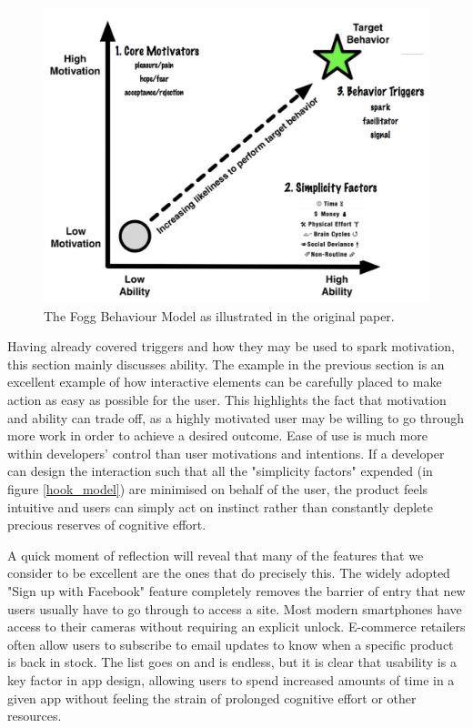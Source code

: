 \begin{figure}[h]
    \begin{center}
        \includegraphics[scale=0.3]{images/fogg_behaviour.png}
    \end{center}
    \caption{The Fogg Behaviour Model as illustrated in the original paper.}
    \label{fig:fogg_behaviour}
\end{figure}

Having already covered triggers and how they may be used to spark motivation, this section mainly discusses ability. The example in the previous section is an excellent example of how interactive elements can be carefully placed to make action as easy as possible for the user. This highlights the fact that motivation and ability can trade off, as a highly motivated user may be willing to go through more work in order to achieve a desired outcome. Ease of use is much more within developers' control than user motivations and intentions. If a developer can design the interaction such that all the "simplicity factors" expended (in figure \ref{hook_model}) are minimised on behalf of the user, the product feels intuitive and users can simply act on instinct rather than constantly deplete precious reserves of cognitive effort.

A quick moment of reflection will reveal that many of the features that we consider to be excellent are the ones that do precisely this. The widely adopted "Sign up with Facebook" feature completely removes the barrier of entry that new users usually have to go through to access a site. Most modern smartphones have access to their cameras without requiring an explicit unlock. E-commerce retailers often allow users to subscribe to email updates to know when a specific product is back in stock. The list goes on and is endless, but it is clear that usability is a key factor in app design, allowing users to spend increased amounts of time in a given app without feeling the strain of prolonged cognitive effort or other resources.

